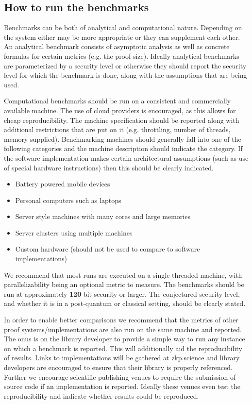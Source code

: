 \subsection{How to run the benchmarks}
Benchmarks can be both of analytical and computational nature. Depending on the system either may be more appropriate or they can supplement each other. An analytical benchmark consists of asymptotic analysis as well as concrete formulas for certain metrics (e.g. the proof size). Ideally analytical benchmarks are parameterized by a security level or otherwise they should report the security level for which the benchmark is done, along with the assumptions that are being used.

Computational benchmarks should be run on a consistent and commercially available machine. The use of cloud providers is encouraged, as this allows for cheap reproducibility. The machine specification should be reported along with additional restrictions that are put on it (e.g. throttling, number of threads, memory supplied). Benchmarking machines should generally fall into one of the following categories and the machine description should indicate the category. If the software implementation makes certain architectural assumptions (such as use of special hardware instructions) then this should be clearly indicated.

\begin{itemize}[label={- }]
    \item Battery powered mobile devices
    \item Personal computers such as laptops
    \item Server style machines with many cores and large memories
    \item Server clusters using multiple machines 
    \item Custom hardware (should not be used to compare to software implementations)
\end{itemize}


We recommend that most runs are executed on a single-threaded machine, with parallelizability being an optional metric to measure. The benchmarks should be run at approximately \textbf{120}-bit security or larger. The conjectured security level, and whether it is in a post-quantum or classical setting, should be clearly stated.

In order to enable better comparisons we recommend that the metrics of other proof systems\slash implementations are also run on the same machine and reported. The onus is on the library developer to provide a simple way to run any instance on which a benchmark is reported.   This will additionally aid the reproducibility of results. Links to implementations will be gathered at zkp.science and library developers are encouraged to ensure that their library is properly referenced. Further we encourage scientific publishing venues to require the submission of source code if an implementation is reported. Ideally these venues even test the reproducibility and indicate whether results could be reproduced.


